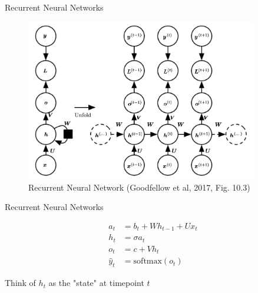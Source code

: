 \documentclass[10pt]{beamer}
\begin{document}
\begin{frame}{Recurrent Neural Networks}

\begin{figure}[h]
\centering
\includegraphics[width=0.9\textwidth]{fig/DL_10_3_RNN.png}
\caption{Recurrent Neural Network (Goodfellow et al, 2017, Fig. 10.3)}
\end{figure}

\end{frame}


\begin{frame}{Recurrent Neural Networks}

\begin{align*}
a_t &= b_t + W h_{t-1} + U x_t \\
h_t &= \sigma{a_t} \\
o_t &= c + V h_{t} \\
\hat{y}_t &= \text{softmax}(o_t)
\end{align*}

Think of $h_t$ as the "state" at timepoint $t$

\end{frame}
\end{document}
